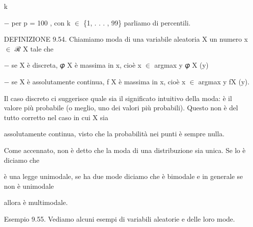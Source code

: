 \documentclass[a4paper,portrait,12pt]{article}
\begin{document}
\begin{flushleft}
k
\end{flushleft}





\begin{flushleft}
$-$ per p = 100 , con k $\in$ \{1, . . . , 99\} parliamo di percentili.
\end{flushleft}


\begin{flushleft}
DEFINIZIONE 9.54. Chiamiamo moda di una variabile aleatoria X un numero x $\in$ ℛ X tale che
\end{flushleft}


\begin{flushleft}
$-$ se X \`{e} discreta, 𝜑 X \`{e} massima in x, cio\`{e} x $\in$ argmax y 𝜑 X (y)
\end{flushleft}


\begin{flushleft}
$-$ se X \`{e} assolutamente continua, f X \`{e} massima in x, cio\`{e} x $\in$ argmax y fX (y).
\end{flushleft}


\begin{flushleft}
Il caso discreto ci suggerisce quale sia il significato intuitivo della moda: \`{e} il valore più probabile (o meglio, uno dei valori più probabili). Questo non \`{e} del tutto corretto nel caso in cui X sia
\end{flushleft}


\begin{flushleft}
assolutamente continua, visto che la probabilit\`{a} nei punti \`{e} sempre nulla.
\end{flushleft}


\begin{flushleft}
Come accennato, non \`{e} detto che la moda di una distribuzione sia unica. Se lo \`{e} diciamo che
\end{flushleft}


\begin{flushleft}
\`{e} una legge unimodale, se ha due mode diciamo che \`{e} bimodale e in generale se non \`{e} unimodale
\end{flushleft}


\begin{flushleft}
allora \`{e} multimodale.
\end{flushleft}


\begin{flushleft}
Esempio 9.55. Vediamo alcuni esempi di variabili aleatorie e delle loro mode.
\end{flushleft}
\end{document}
